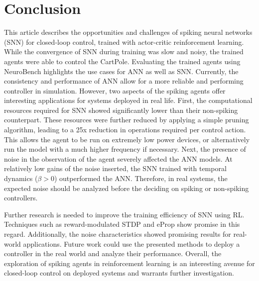 \section{Conclusion}\label{section:Conc_Recc}
This article describes the opportunities and challenges of spiking neural networks (SNN) for closed-loop control, trained with actor-critic reinforcement learning. While the convergence of SNN during training was slow and noisy, the trained agents were able to control the CartPole. Evaluating the trained agents using NeuroBench highlights the use cases for ANN as well as SNN. Currently, the consistency and performance of ANN allow for a more reliable and performing controller in simulation. However, two aspects of the spiking agents offer interesting applications for systems deployed in real life. First, the computational resources required for SNN showed significantly lower than their non-spiking counterpart. These resources were further reduced by applying a simple pruning algorithm, leading to a 25x reduction in operations required per control action. This allows the agent to be run on extremely low power devices, or alternatively run the model with a much higher frequency if necessary. Next, the presence of noise in the observation of the agent severely affected the ANN models. At relatively low gains of the noise inserted, the SNN trained with temporal dynamics ($\beta>0$) outperformed the ANN. Therefore, in real systems, the expected noise should be analyzed before the deciding on spiking or non-spiking controllers.

Further research is needed to improve the training efficiency of SNN using RL. Techniques such as reward-modulated STDP and eProp show promise in this regard. Additionally, the noise characteristics showed promising results for real-world applications. Future work could use the presented methods to deploy a controller in the real world and analyze their performance. Overall, the exploration of spiking agents in reinforcement learning is an interesting avenue for closed-loop control on deployed systems and warrants further investigation.